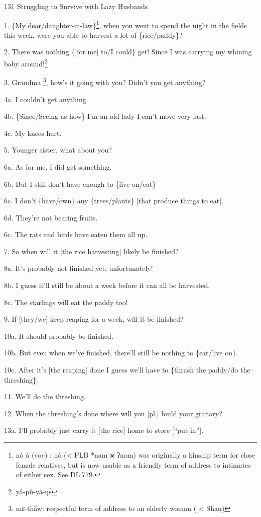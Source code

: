 
131 Struggling to Survive with Lazy Husbands

1. \{My dear/daughter-in-law\}\footnote{nò à (voc) : nò (< PLB *nam ⪤ ʔnam) was originally a kinship term for close female relatives, but is now usable as a friendly term of address to intimates of either sex. See DL:779.}, when you went to spend the night in the fields
this week, were you able to harvest a lot of \{rice/paddy\}?

2. There was nothing \{[for me] to/I could\} get! Since I was carrying my whining
baby around!\footnote{yâ-pû-yâ-ŋɛ̀}

3. Grandma \footnote{mɛ-thāw: respectful term of address to an elderly woman ( < Shan)}, how's it going with you? Didn't you get anything?

4a. I couldn't get anything.

4b. \{Since/Seeing as how\} I'm an old lady I can't move very fast.

4c. My knees hurt.

5. Younger sister, what about you?

6a. As for me, I did get something.

6b. But I still don't have enough to \{live on/eat\}

6c. I don't \{have/own\} any \{trees/plants\} [that produce things to eat].

6d. They're not bearing fruits.

6c. The rats and birds have eaten them all up.

7. So when will it [the rice harvesting] likely be finished?

8a. It's probably not finished yet, unfortunately!

8b. I guess it'll still be about a week before it can all be harvested.

8c. The starlings will eat the paddy too!

9. If [they/we] keep reaping for a week, will it be finished?

10a. It should probably be finished.

10b. But even when we've finished, there'll still be nothing to \{eat/live on\}.

10c. After it's [the reaping] done I guess we'll have to \{thrash the paddy/do
the threshing\}.

11. We'll do the threshing.

12. When the threshing's done where will you [pl.] build your granary?

13a. I'll probably just carry it [the rice] home to store [``put in''].

